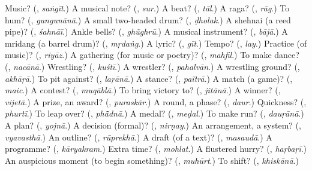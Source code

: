 \begin{tcolorbox}[breakable,colback=teal!4,colframe=teal!35!black,title={Before you move on}]
Music? (\textbf{}, \emph{saṅgīt}.) A musical note? (\textbf{}, \emph{sur}.) A beat? (\textbf{}, \emph{tāl}.) A raga? (\textbf{}, \emph{rāg}.) To hum? (\textbf{}, \emph{gungunānā}.) A small two-headed drum? (\textbf{}, \emph{ḍholak}.) A shehnai (a reed pipe)? (\textbf{}, \emph{śahnāī}.) Ankle bells? (\textbf{}, \emph{ghũghrū}.) A musical instrument? (\textbf{}, \emph{bājā}.) A mridang (a barrel drum)? (\textbf{}, \emph{mṛdaṅg}.) A lyric? (\textbf{}, \emph{gīt}.) Tempo? (\textbf{}, \emph{lay}.) Practice (of music)? (\textbf{}, \emph{riyāz}.) A gathering (for music or poetry)? (\textbf{}, \emph{mahfil}.) To make dance? (\textbf{}, \emph{nacānā}.) Wrestling? (\textbf{}, \emph{kuśtī}.) A wrestler? (\textbf{}, \emph{pahalvān}.) A wrestling ground? (\textbf{}, \emph{akhāṛā}.) To pit against? (\textbf{}, \emph{laṛānā}.) A stance? (\textbf{}, \emph{paĩtrā}.) A match (a game)? (\textbf{}, \emph{maic}.) A contest? (\textbf{}, \emph{muqāblā}.) To bring victory to? (\textbf{}, \emph{jitānā}.) A winner? (\textbf{}, \emph{vijetā}.) A prize, an award? (\textbf{}, \emph{puraskār}.) A round, a phase? (\textbf{}, \emph{daur}.) Quickness? (\textbf{}, \emph{phurtī}.) To leap over? (\textbf{}, \emph{phā̃dnā}.) A medal? (\textbf{}, \emph{meḍal}.) To make run? (\textbf{}, \emph{dauṛānā}.) A plan? (\textbf{}, \emph{yojnā}.) A decision (formal)? (\textbf{}, \emph{nirṇay}.) An arrangement, a system? (\textbf{}, \emph{vyavasthā}.) An outline? (\textbf{}, \emph{rūprekhā}.) A draft (of a text)? (\textbf{}, \emph{masaudā}.) A programme? (\textbf{}, \emph{kāryakram}.) Extra time? (\textbf{}, \emph{mohlat}.) A flustered hurry? (\textbf{}, \emph{haṛbaṛī}.) An auspicious moment (to begin something)? (\textbf{}, \emph{muhūrt}.) To shift? (\textbf{}, \emph{khiskānā}.)
\end{tcolorbox}
